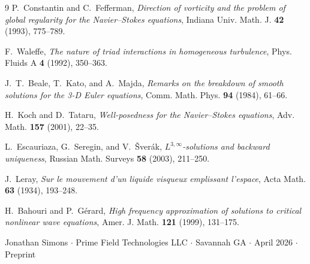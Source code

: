 \documentclass[11pt]{article}
\begin{document}
\begin{thebibliography}{9}
P.~Constantin and C.~Fefferman,
\textit{Direction of vorticity and the problem of global regularity for the Navier--Stokes equations},
Indiana Univ. Math. J. \textbf{42} (1993), 775--789.

F.~Waleffe,
\textit{The nature of triad interactions in homogeneous turbulence},
Phys. Fluids A \textbf{4} (1992), 350--363.

J.~T.~Beale, T.~Kato, and A.~Majda,
\textit{Remarks on the breakdown of smooth solutions for the 3-D Euler equations},
Comm. Math. Phys. \textbf{94} (1984), 61--66.

H.~Koch and D.~Tataru,
\textit{Well-posedness for the Navier--Stokes equations},
Adv. Math. \textbf{157} (2001), 22--35.

L.~Escauriaza, G.~Seregin, and V.~\v{S}ver\'{a}k,
\textit{$L^{3,\infty}$-solutions and backward uniqueness},
Russian Math. Surveys \textbf{58} (2003), 211--250.

J.~Leray,
\textit{Sur le mouvement d'un liquide visqueux emplissant l'espace},
Acta Math. \textbf{63} (1934), 193--248.

H.~Bahouri and P.~G\'erard,
\textit{High frequency approximation of solutions to critical nonlinear wave equations},
Amer. J. Math. \textbf{121} (1999), 131--175.
\end{thebibliography}

\vfill
\begin{center}
{\small Jonathan Simons $\cdot$ Prime Field Technologies LLC $\cdot$ Savannah GA
$\cdot$ April 2026 $\cdot$ Preprint}
\end{center}
\end{document}
